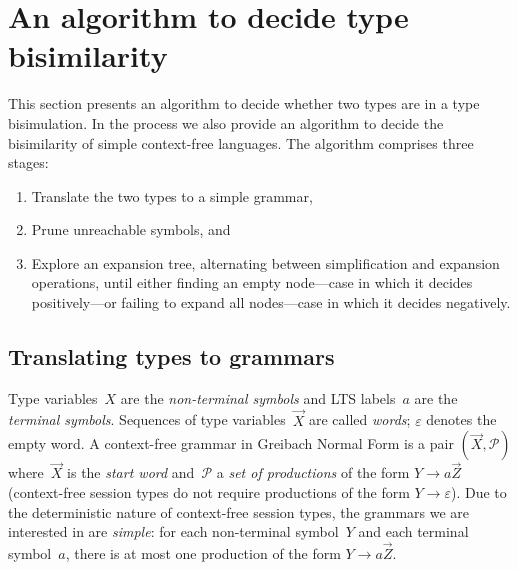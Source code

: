 \section{An algorithm to decide type bisimilarity}
\label{sec:algorithm}



This section presents an algorithm to decide whether two types are in
a type bisimulation. In the process we also provide an algorithm to
decide the bisimilarity of simple context-free languages.
%
The algorithm comprises three stages:
%
\begin{enumerate}
\item Translate the two types to a simple grammar,
\item Prune unreachable symbols, and
\item Explore an expansion tree, alternating between simplification
  and expansion operations, until either finding an empty node---case
  in which it decides positively---or failing to expand all nodes---case
  in which it decides negatively.
\end{enumerate}

\subsection{Translating types to grammars}


Type variables~$X$ are the \emph{non-terminal symbols} and LTS
labels~$a$ are the \emph{terminal symbols}. Sequences of type
variables~$\vec X$ are called \emph{words}; $\varepsilon$ denotes the
empty word.
%
A context-free grammar in Greibach Normal Form is a pair
$(\vec X,\mathcal P)$ where~$\vec X$ is the \emph{start word}
and~$\mathcal P$ a \emph{set of productions} of the form
$Y \rightarrow a\vec Z$ (context-free session types do not require
productions of the form $Y \rightarrow\varepsilon$).
%
Due to the deterministic nature of context-free session types, the
grammars we are interested in are \emph{simple}: for each
non-terminal symbol~$Y$ and each terminal symbol~$a$, there is at most
one production of the form $Y \rightarrow a\vec Z$.

